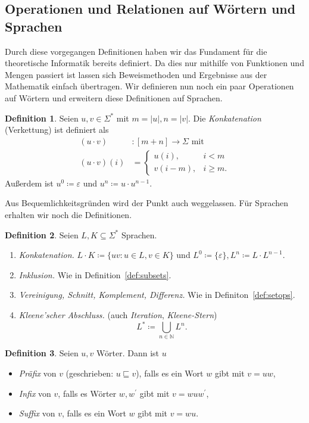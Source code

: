 \documentclass[11pt, a4paper]{article}
\theoremstyle{definition}
\newtheorem{definition}{Definition}[section]
\theoremstyle{plain}
\numberwithin{equation}{section}
\begin{document}
\subsection{Operationen und Relationen auf Wörtern und Sprachen}\label{sec:awl_wordops}
Durch diese vorgegangen Definitionen haben wir das Fundament für die theoretische Informatik bereits definiert. Da dies nur mithilfe von Funktionen und Mengen  passiert ist lassen sich Beweismethoden und Ergebnisse aus der Mathematik einfach übertragen. Wir definieren nun noch ein paar Operationen auf Wörtern und erweitern diese Definitionen auf Sprachen.
\begin{definition}
	Seien $u, v \in \Sigma^\ast$ mit $m = |u|, n = |v|$. Die \textit{Konkatenation} (Verkettung) ist definiert als
	\begin{align*}
		(u \cdot v)&\colon [m{+}n] \to \Sigma \text{ mit}\\
		(u \cdot v)(i) &= \left\lbrace \begin{array}{ll}u(i), & i < m\\ v(i-m), & i \geq m. \end{array} \right.
	\end{align*}
	Außerdem ist $u^0 \coloneqq \varepsilon$ und $u^n \coloneqq u \cdot u^{n-1}$.
\end{definition}
Aus Bequemlichkeitsgründen wird der Punkt auch weggelassen. Für Sprachen erhalten wir noch die Definitionen.
\begin{definition}
	Seien $L, K \subseteq \Sigma^\ast$ Sprachen.
	\begin{enumerate}
		\item \textit{Konkatenation.} $L \cdot K \coloneqq \{ uv : u \in L, v \in K \}$ und $L^0 \coloneqq \{ \varepsilon \}, L^n \coloneqq L \cdot L^{n-1}$.
		\item \textit{Inklusion.} Wie in Definition~\ref{def:subsets}.
		\item \textit{Vereinigung, Schnitt, Komplement, Differenz.} Wie in Definiton~\ref{def:setops}.
		\item \textit{Kleene'scher Abschluss.} (auch \textit{Iteration}, \textit{Kleene-Stern})
			$$
				L^\ast \coloneqq \bigcup_{n \in \mathbb{N}} L^n.
			$$
	\end{enumerate}
\end{definition}
\begin{definition}
	Seien $u, v$ Wörter. Dann ist $u$
	\begin{itemize}
		\item \textit{Präfix} von $v$ (geschrieben: $u \sqsubseteq v$), falls es ein Wort $w$ gibt mit $v = uw$,
		\item \textit{Infix} von $v$, falls es Wörter $w, w^\prime$ gibt mit $v = wuw^\prime$,
		\item \textit{Suffix} von $v$, falls es ein Wort $w$ gibt mit $v = wu$.
	\end{itemize}
\end{definition}
\end{document}
